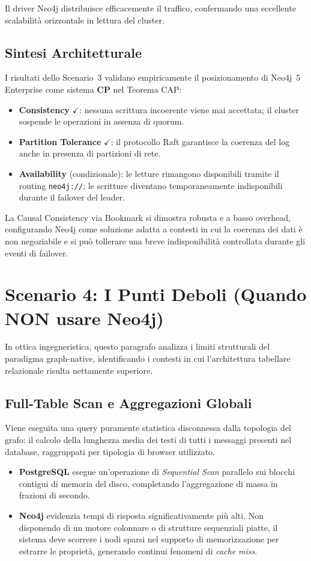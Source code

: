 Il driver Neo4j distribuisce efficacemente il traffico, confermando una eccellente scalabilità orizzontale in lettura del cluster.

\subsection{Sintesi Architetturale}
I risultati dello Scenario~3 validano empiricamente il posizionamento di Neo4j~5 Enterprise come sistema \textbf{CP} nel Teorema CAP:

\begin{itemize}
  \item \textbf{Consistency} $\checkmark$: nessuna scrittura incoerente viene mai accettata; il cluster sospende le operazioni in assenza di quorum.
  \item \textbf{Partition Tolerance} $\checkmark$: il protocollo Raft garantisce la coerenza del log anche in presenza di partizioni di rete.
  \item \textbf{Availability} (condizionale): le letture rimangono disponibili tramite il routing \texttt{neo4j://}; le scritture diventano temporaneamente indisponibili durante il failover del leader.
\end{itemize}

La Causal Consistency via Bookmark si dimostra robusta e a basso overhead, configurando Neo4j come soluzione adatta a contesti in cui la coerenza dei dati è non negoziabile e si può tollerare una breve indisponibilità controllata durante gli eventi di failover.



\section{Scenario 4: I Punti Deboli (Quando NON usare Neo4j)}
\label{sec:scenario4}
In ottica ingegneristica, questo paragrafo analizza i limiti strutturali del paradigma graph-native, identificando i contesti in cui l'architettura tabellare relazionale risulta nettamente superiore.

\subsection{Full-Table Scan e Aggregazioni Globali}
Viene eseguita una query puramente statistica disconnessa dalla topologia del grafo: il calcolo della lunghezza media dei testi di tutti i messaggi presenti nel database, raggruppati per tipologia di browser utilizzato.
\begin{itemize}
  \item \textbf{PostgreSQL} esegue un'operazione di \textit{Sequential Scan} parallelo sui blocchi contigui di memoria del disco, completando l'aggregazione di massa in frazioni di secondo.
  \item \textbf{Neo4j} evidenzia tempi di risposta significativamente più alti. Non disponendo di un motore colonnare o di strutture sequenziali piatte, il sistema deve scorrere i nodi sparsi nel supporto di memorizzazione per estrarre le proprietà, generando continui fenomeni di \textit{cache miss}.
\end{itemize}

